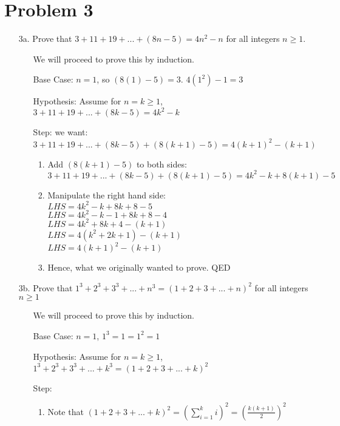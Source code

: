 \documentclass[11pt,letterpaper]{article}
\begin{document}
\newpage

\section*{Problem 3}
\begin{enumerate}
	\item[3a.] Prove that $3+11+19+...+(8n-5) = 4n^2-n$ for all integers $n \geq 1$.
	\begin{enumerate}
		\item[] We will proceed to prove this by induction.
		\item[] Base Case: $n = 1$, so $(8(1) - 5) = 3$. $4(1^2) - 1 = 3$
		\item[] Hypothesis: Assume for $n = k \geq 1$, $3+11+19+... +(8k-5) = 4k^2-k$
		\item[] Step: we want: $3+11+19+...+ (8k-5) + (8(k+1) -5) = 4(k+1)^2 - (k+1)$
		\begin{enumerate}
			\item Add $(8(k+1) -5)$ to both sides: 
			\\ $3+11+19+...+ (8k-5) + (8(k+1) -5) = 4k^2 - k + 8(k+1) - 5$
			\item Manipulate the right hand side:
			\\$LHS = 4k^2 - k + 8k + 8 - 5$
			\\$LHS = 4k^2 - k - 1 + 8k + 8 - 4$
			\\$LHS = 4k^2 + 8k + 4 - (k + 1)$
			\\$LHS = 4(k^2 + 2k + 1) - (k + 1)$
			\\$LHS = 4(k + 1)^2 - (k + 1)$
			\item Hence, what we originally wanted to prove. QED
		\end{enumerate}
	\end{enumerate}
	\item[3b.] Prove that $1^3 + 2^3 + 3^3 + ... + n^3 = (1 + 2 + 3 + ... + n)^2$ for all integers $n\geq 1$
	\begin{enumerate}
		\item[] We will proceed to prove this by induction.
		\item[] Base Case: $n = 1$, $1^3 = 1 = 1^2 = 1$
		\item[] Hypothesis: Assume for $n = k \geq 1$, $1^3 + 2^3 + 3^3 + ... + k^3 = (1 + 2 + 3 + ... + k)^2$
		\item[] Step: \begin{enumerate}
			\item Note that $(1 + 2 + 3 + ... + k)^2 = (\sum\limits_{i=1}^k i)^2 = (\frac{k(k+1)}{2})^2$

\end{enumerate}
\end{enumerate}
\end{enumerate}
\end{document}
